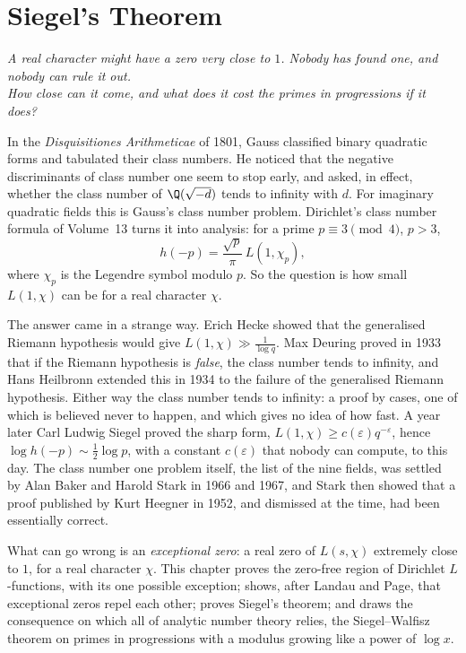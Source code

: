 \chapter{Siegel's Theorem}\label{ch:siegel}
\begin{center}\itshape
A real character might have a zero very close to $1$. Nobody has found one, and nobody can rule it out.\\
How close can it come, and what does it cost the primes in progressions if it does?
\end{center}

In the \emph{Disquisitiones Arithmeticae} of 1801, Gauss classified binary quadratic forms and tabulated their class numbers. He noticed that the negative discriminants of class number one seem to stop early, and asked, in effect, whether the class number of $\Q(\sqrt{-d})$ tends to infinity with $d$. For imaginary quadratic fields this is
Gauss's class number problem. Dirichlet's class number formula of Volume~13 turns it into analysis: for a prime $p\equiv3\pmod4$, $p>3$,
\[
h(-p)=\frac{\sqrt p}\pi\,L(1,\chi_p),
\]
where $\chi_p$ is the Legendre symbol modulo $p$. So the question is how small $L(1,\chi)$ can be for a real character $\chi$.

The answer came in a strange way. Erich Hecke showed that the generalised Riemann hypothesis would give $L(1,\chi)\gg\frac1{\log q}$. Max Deuring proved in 1933 that if the Riemann hypothesis is \emph{false}, the class number tends to infinity, and Hans Heilbronn extended this in 1934 to the failure of the generalised Riemann
hypothesis. Either way the class number tends to infinity: a proof by cases, one of which is believed never to happen, and which gives no idea of how fast. A year later Carl Ludwig Siegel proved the sharp form, $L(1,\chi)\ge c(\varepsilon)q^{-\varepsilon}$, hence $\log h(-p)\sim\frac12\log p$, with a constant $c(\varepsilon)$ that nobody can compute, to this day.
The class number one problem itself, the list of the nine fields, was settled by Alan Baker and Harold Stark in 1966 and 1967, and Stark then showed that a proof published by Kurt Heegner in 1952, and dismissed at the time, had been essentially correct.

What can go wrong is an \emph{exceptional zero}: a real zero of $L(s,\chi)$ extremely close to $1$, for a real character $\chi$. This chapter proves the zero-free region of Dirichlet $L$-functions, with its one possible exception; shows, after Landau and Page, that exceptional zeros repel each other; proves Siegel's theorem; and draws the consequence
on which all of analytic number theory relies, the Siegel--Walfisz theorem on primes in progressions with a modulus growing like a power of $\log x$.

